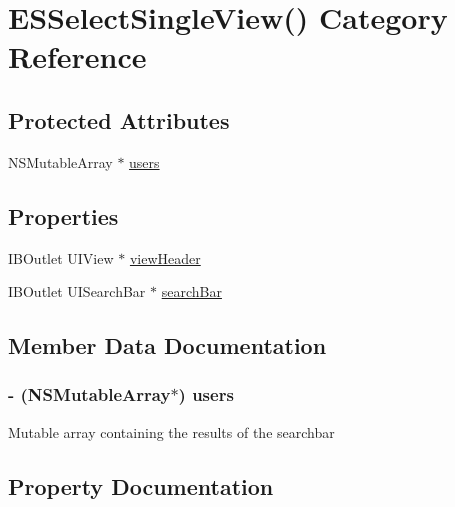 \hypertarget{category_e_s_select_single_view_07_08}{}\section{E\+S\+Select\+Single\+View() Category Reference}
\label{category_e_s_select_single_view_07_08}
\subsection*{Protected Attributes}
\begin{DoxyCompactItemize}
\item 
N\+S\+Mutable\+Array $\ast$ \hyperlink{category_e_s_select_single_view_07_08_a6b792edfb33e736af544c1de36a30154}{users}
\end{DoxyCompactItemize}
\subsection*{Properties}
\begin{DoxyCompactItemize}
\item 
I\+B\+Outlet U\+I\+View $\ast$ \hyperlink{category_e_s_select_single_view_07_08_af56705aecef2fbcbf9d7feda0e82b9d7}{view\+Header}
\item 
I\+B\+Outlet U\+I\+Search\+Bar $\ast$ \hyperlink{category_e_s_select_single_view_07_08_a1819c9c0923b4b728dcc8b84fc6f5337}{search\+Bar}
\end{DoxyCompactItemize}


\subsection{Member Data Documentation}
\hypertarget{category_e_s_select_single_view_07_08_a6b792edfb33e736af544c1de36a30154}{}
\subsubsection[{users}]{\setlength{\rightskip}{0pt plus 5cm}-\/ (N\+S\+Mutable\+Array$\ast$) users\hspace{0.3cm}{\ttfamily [protected]}}\label{category_e_s_select_single_view_07_08_a6b792edfb33e736af544c1de36a30154}
Mutable array containing the results of the searchbar 

\subsection{Property Documentation}
\hypertarget{category_e_s_select_single_view_07_08_a1819c9c0923b4b728dcc8b84fc6f5337}{}
